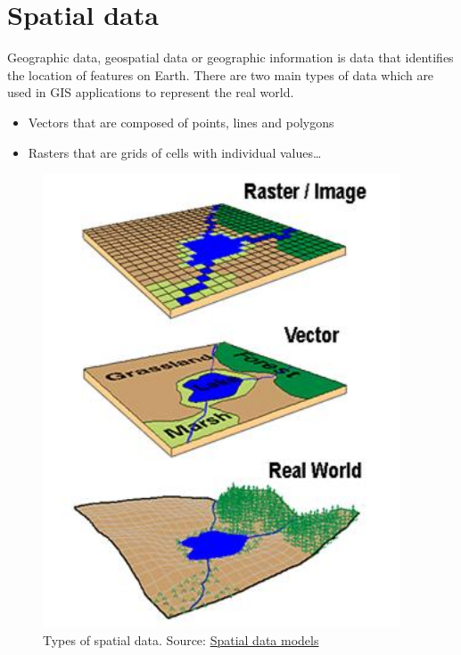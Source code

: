 \documentclass[
  letterpaper,
]{scrbook}
\begin{document}
\hypertarget{spatial-data-1}{%
\section{Spatial data}\label{spatial-data-1}}

Geographic data, geospatial data or geographic information is data that
identifies the location of features on Earth. There are two main types
of data which are used in GIS applications to represent the real world.

\begin{itemize}
\item
  Vectors that are composed of points, lines and polygons
\item
  Rasters that are grids of cells with individual values\ldots{}
\end{itemize}

\begin{figure}

{\centering \includegraphics[width=4.16667in,height=\textheight]{general_images/rasvec.jpg}

}

\caption{Types of spatial data. Source:
\href{https://planet.uwc.ac.za/nisl/gis/web_page/page_15.htm}{Spatial
data models}}

\end{figure}
\end{document}

